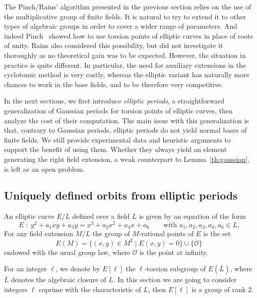 The Pinch/Rains' algorithm presented in the previous section relies on the use
of the multiplicative group of finite fields.
It is natural to try to extend it to other types of algebraic groups in
order to cover a wider range of parameters.
And indeed Pinch~\cite{Pinch} showed how to use torsion points of elliptic
curves in place of roots of unity.
Rains also considered this possibility, but did not investigate it thoroughly
as no theoretical gain was to be expected.
However, the situation in practice is quite different.
In particular, the need for auxiliary extensions in the cyclotomic method
is very costly, whereas the elliptic variant has naturally more chances
to work in the base fields, and to be therefore very competitive.

In the next sections, we first introduce \emph{elliptic periods}, a
straightforward generalization of Gaussian periods for torsion points
of elliptic curves,
then analyze the cost of their computation.
The main issue with this generalization is that, contrary to Gaussian periods,
elliptic periods do not yield normal bases of finite fields.
We still provide experimental data and heuristic arguments
to support the benefit of using them.
Whether they always yield an element generating the right field extension,
a weak counterpart to Lemma~\ref{th:gaussian}, is left as an open problem.

\subsection{Uniquely defined orbits from elliptic periods}
\label{sec:ellperiods}

An elliptic curve $E/L$ defined over a field $L$ is given by an
equation of the form
\begin{equation*}
  E\;:\; y^2 + a_1xy + a_3y = x^3 + a_2x^2 + a_4x + a_6
  \qquad\text{with $a_1,a_2,a_3,a_4,a_6\in L$.}
\end{equation*}
For any field extension $M/L$ the group of $M$-rational points of $E$
is the set
\begin{equation*}
  E(M) = \{(x,y)\in M^2 \mid E(x,y) = 0\} \cup \{\mathcal{O}\}
\end{equation*}
endowed with the usual group law, where $\mathcal{O}$ is the point at
infinity.

For an integer $\ell$, we denote by $E[\ell]$ the $\ell$-torsion
subgroup of $E(\bar{L})$, where $\bar{L}$ denotes the algebraic
closure of $L$. In this section we are going to consider integers
$\ell$ coprime with the characteristic of $L$, then $E[\ell]$ is a
group of rank $2$.

